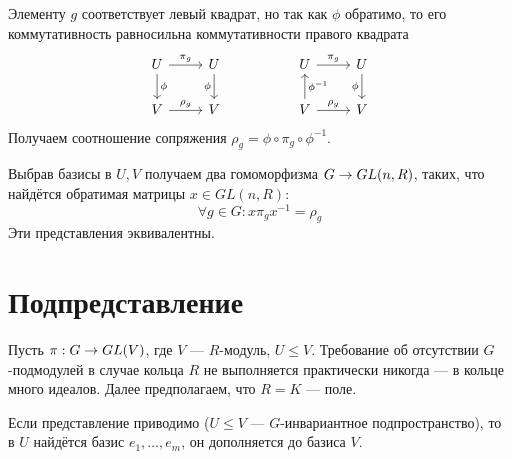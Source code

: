 Элементу $g$ соответствует левый квадрат, но так как $\phi$ обратимо, то его коммутативность равносильна коммутативности правого квадрата
\[\begin{tikzcd}[ampersand replacement=\&]
      U \& U \&\& U \& U \\
      V \& V \&\& V \& V
      \arrow["\phi", from=1-1, to=2-1]
      \arrow["{\pi_g}", from=1-1, to=1-2]
      \arrow["{\rho_g}", from=2-1, to=2-2]
      \arrow["\phi"', from=1-2, to=2-2]
      \arrow["{\rho_g}", from=2-4, to=2-5]
      \arrow["{\pi_g}", from=1-4, to=1-5]
      \arrow["{\phi^{-1}}"', from=2-4, to=1-4]
      \arrow["\phi"', from=1-5, to=2-5]
\end{tikzcd}\]
Получаем соотношение сопряжения $\rho_g = \phi \circ \pi_g \circ \phi^{-1}$.

Выбрав базисы в $U, V$ получаем два гомоморфизма $G \rightarrow GL(n, R)$, таких, что найдётся обратимая матрицы $x \in GL(n, R)$:
\[\forall g \in G: x \pi_g x^{-1} = \rho_g\]
Эти представления эквивалентны.


\section{Подпредставление}
Пусть $\pi: G \rightarrow GL(V)$, где $V$ --- $R$-модуль, $U \le V$.
Требование об отсутствии $G$-подмодулей в случае кольца $R$ не выполняется практически никогда --- в кольце много идеалов.
Далее предполагаем, что $R = K$ --- поле.

Если представление приводимо ($U \le V$ --- $G$-инвариантное подпространство), то в $U$ найдётся базис $e_1, \dots, e_m$, он дополняется до базиса $V$.

